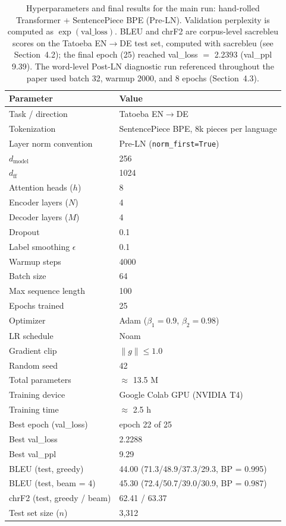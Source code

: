 \begin{table}[h]
\centering
\begin{tabular}{ll}
\toprule
\textbf{Parameter} & \textbf{Value} \\
\midrule
Task / direction & Tatoeba EN$\rightarrow$DE \\
Tokenization & SentencePiece BPE, 8k pieces per language \\
Layer norm convention & Pre-LN (\texttt{norm\_first=True}) \\
$d_{\text{model}}$ & 256 \\
$d_{\text{ff}}$ & 1024 \\
Attention heads ($h$) & 8 \\
Encoder layers ($N$) & 4 \\
Decoder layers ($M$) & 4 \\
Dropout & 0.1 \\
Label smoothing $\epsilon$ & 0.1 \\
Warmup steps & 4000 \\
Batch size & 64 \\
Max sequence length & 100 \\
Epochs trained & 25 \\
Optimizer & Adam ($\beta_1=0.9$, $\beta_2=0.98$) \\
LR schedule & Noam \\
Gradient clip & $\lVert g \rVert \leq 1.0$ \\
Random seed & 42 \\
Total parameters & $\approx$ 13.5 M \\
Training device & Google Colab GPU (NVIDIA T4) \\
Training time & $\approx$ 2.5 h \\
Best epoch (val\_loss) & epoch 22 of 25 \\
Best val\_loss & 2.2288 \\
Best val\_ppl & 9.29 \\
BLEU (test, greedy) & 44.00 (71.3/48.9/37.3/29.3, BP = 0.995) \\
BLEU (test, beam = 4) & 45.30 (72.4/50.7/39.0/30.9, BP = 0.987) \\
chrF2 (test, greedy / beam) & 62.41 / 63.37 \\
Test set size ($n$) & 3,312 \\
\bottomrule
\end{tabular}
\caption{Hyperparameters and final results for the main run: hand-rolled Transformer + SentencePiece BPE (Pre-LN). Validation perplexity is computed as $\exp(\text{val\_loss})$. BLEU and chrF2 are corpus-level sacrebleu scores on the Tatoeba EN$\rightarrow$DE test set, computed with sacrebleu (see Section~4.2); the final epoch (25) reached val\_loss $=$ 2.2393 (val\_ppl 9.39). The word-level Post-LN diagnostic run referenced throughout the paper used batch 32, warmup 2000, and 8 epochs (Section~4.3).}
\label{tab:hparams}
\end{table}

